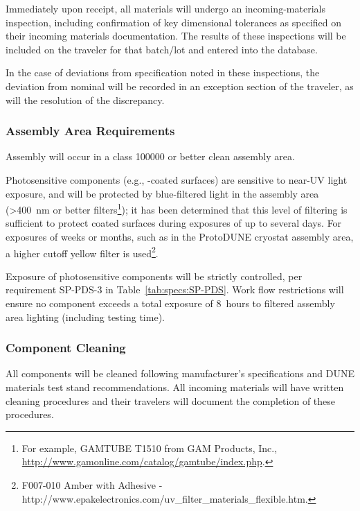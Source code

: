 Immediately upon receipt, all materials will undergo an incoming-materials inspection, including confirmation of key dimensional tolerances as specified on their incoming materials documentation. %
The results of these inspections will be included on the traveler for that batch/lot and entered into the database.

In the case of deviations from specification noted in these inspections, the deviation from nominal will be recorded in an exception section of the traveler, as will the resolution of the discrepancy.

\subsubsection{Assembly Area Requirements}

Assembly will occur in a class \num{100000} or better clean assembly area.  

%

Photosensitive components (e.g., -coated surfaces) are sensitive to near-UV light exposure, and will be protected by blue-filtered light in the assembly area (>\SI{400}{nm} or better filters\footnote{For example, GAMTUBE T1510\texttrademark{} from GAM Products, Inc., \url{http://www.gamonline.com/catalog/gamtube/index.php}.}); it has been determined that this level of filtering is sufficient to protect coated surfaces during  exposures of up to several days. For exposures of weeks or months, such as in the ProtoDUNE cryostat assembly area, a higher cutoff yellow filter is used\footnote{F007-010\texttrademark{} Amber with Adhesive - http://www.epakelectronics.com/uv\_filter\_materials\_flexible.htm.}. 


Exposure of photosensitive components will be strictly controlled, per requirement SP-PDS-3 in Table~\ref{tab:specs:SP-PDS}.  
Work flow restrictions will %
ensure no component exceeds a total exposure of \SI{8}{hours} to filtered assembly area lighting (including testing time).

\subsubsection{Component Cleaning}
\label{sssec:cleaning}
All components will be cleaned %
following manufacturer's specifications and DUNE materials test stand recommendations.  %
All incoming materials will have written cleaning procedures and their travelers will document the completion of these procedures.

